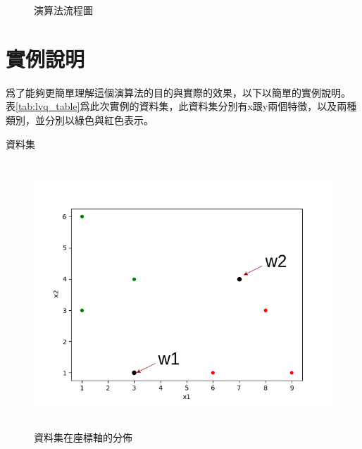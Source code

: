 \begin{figure}
	\centering
	
	\caption{演算法流程圖}
	\label{fig:AlogrithmWorkflow}
\end{figure}

\section{實例說明}

爲了能夠更簡單理解這個演算法的目的與實際的效果，以下以簡單的實例說明。
表\ref{tab:lvq_table}爲此次實例的資料集，此資料集分別有x跟y兩個特徵，以及兩種類別，並分別以綠色與紅色表示。


\begin{table}[h!]
	\centering
	\caption{資料集}
	\label{tab:lvq_table}
	
\end{table}


\begin{figure}[h!]
	\centering
	\includegraphics[height=10cm]{./pic/2nSRVeud.png}
	\caption{資料集在座標軸的分佈}
	\label{fig:DatasetInAxis}
\end{figure}

